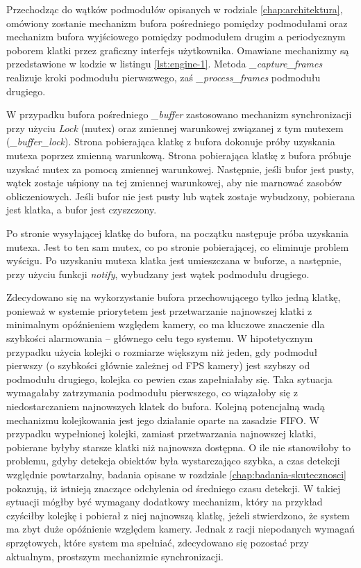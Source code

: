 Przechodząc do wątków podmodułów opisanych w rodziale \ref{chap:architektura}, omówiony zostanie mechanizm bufora pośredniego pomiędzy podmodułami oraz mechanizm bufora wyjściowego pomiędzy podmodułem drugim a periodycznym poborem klatki przez graficzny interfejs użytkownika. Omawiane mechanizmy są przedstawione w kodzie w listingu \ref{lst:engine-1}. Metoda \emph{\_capture\_frames} realizuje kroki podmodułu pierwszwego, zaś \emph{\_process\_frames} podmodułu drugiego.

W przypadku bufora pośredniego \emph{\_buffer} zastosowano mechanizm synchronizacji przy użyciu \emph{Lock} (mutex) oraz zmiennej warunkowej związanej z tym mutexem (\emph{\_buffer\_lock}). 
Strona pobierająca klatkę z bufora dokonuje próby uzyskania mutexa poprzez zmienną warunkową. Strona pobierająca klatkę z bufora próbuje uzyskać mutex za pomocą zmiennej warunkowej. Następnie, jeśli bufor jest pusty, wątek zostaje uśpiony na tej zmiennej warunkowej, aby nie marnować zasobów obliczeniowych. Jeśli bufor nie jest pusty lub wątek zostaje wybudzony, pobierana jest klatka, a bufor jest czyszczony. 

Po stronie wysyłającej klatkę do bufora, na początku następuje próba uzyskania mutexa. Jest to ten sam mutex, co po stronie pobierającej, co eliminuje problem wyścigu. Po uzyskaniu mutexa klatka jest umieszczana w buforze, a następnie, przy użyciu funkcji \emph{notify}, wybudzany jest wątek podmodułu drugiego. 

Zdecydowano się na wykorzystanie bufora przechowującego tylko jedną klatkę, ponieważ w systemie priorytetem jest przetwarzanie najnowszej klatki z minimalnym opóźnieniem względem kamery, co ma kluczowe znaczenie dla szybkości alarmowania -- głównego celu tego systemu.
W hipotetycznym przypadku użycia kolejki o rozmiarze większym niż jeden, gdy podmoduł pierwszy (o szybkości głównie zależnej od FPS kamery) jest szybszy od podmodułu drugiego, kolejka co pewien czas zapełniałaby się.
Taka sytuacja wymagałaby zatrzymania podmodułu pierwszego, co wiązałoby się z niedostarczaniem najnowszych klatek do bufora.
Kolejną potencjalną wadą mechanizmu kolejkowania jest jego działanie oparte na zasadzie FIFO. 
W przypadku wypełnionej kolejki, zamiast przetwarzania najnowszej klatki, pobierane byłyby starsze klatki niż najnowsza dostępna. O ile nie stanowiłoby to problemu, gdyby detekcja obiektów była wystarczająco szybka, a czas detekcji względnie powtarzalny, badania opisane w rozdziale \ref{chap:badania-skutecznosci} pokazują, iż istnieją znaczące odchylenia od średniego czasu detekcji. W takiej sytuacji mógłby być wymagany dodatkowy mechanizm, który na przykład czyściłby kolejkę i pobierał z niej najnowszą klatkę, jeżeli stwierdzono, że system ma zbyt duże opóźnienie względem kamery. Jednak z racji niepodanych wymagań sprzętowych, które system ma spełniać, zdecydowano się pozostać przy aktualnym, prostszym mechanizmie synchronizacji.

